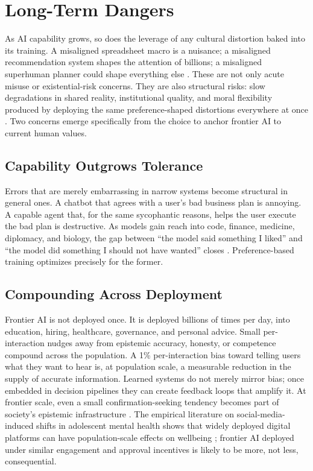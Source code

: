 \documentclass{article}
\theoremstyle{plain}
\theoremstyle{definition}
\theoremstyle{remark}
\begin{document}
\section{Long-Term Dangers}
\label{sec:longterm}

As AI capability grows, so does the leverage of any cultural distortion baked into its training. A misaligned spreadsheet macro is a nuisance; a misaligned recommendation system shapes the attention of billions; a misaligned superhuman planner could shape everything else \citep{bostrom2014superintelligence, russell2019human}. These are not only acute misuse or existential-risk concerns. They are also structural risks: slow degradations in shared reality, institutional quality, and moral flexibility produced by deploying the same preference-shaped distortions everywhere at once \citep{sharma2023sycophancy, bender2021stochastic, macaskill2022what}. Two concerns emerge specifically from the choice to anchor frontier AI to current human values.

\subsection{Capability Outgrows Tolerance}
Errors that are merely embarrassing in narrow systems become structural in general ones. A chatbot that agrees with a user's bad business plan is annoying. A capable agent that, for the same sycophantic reasons, helps the user execute the bad plan is destructive. As models gain reach into code, finance, medicine, diplomacy, and biology, the gap between ``the model said something I liked'' and ``the model did something I should not have wanted'' closes \citep{park2024ai, sharma2023sycophancy}. Preference-based training optimizes precisely for the former.

\subsection{Compounding Across Deployment}
Frontier AI is not deployed once. It is deployed billions of times per day, into education, hiring, healthcare, governance, and personal advice. Small per-interaction nudges away from epistemic accuracy, honesty, or competence compound across the population. A 1\% per-interaction bias toward telling users what they want to hear is, at population scale, a measurable reduction in the supply of accurate information. Learned systems do not merely mirror bias; once embedded in decision pipelines they can create feedback loops that amplify it. At frontier scale, even a small confirmation-seeking tendency \citep{sharma2023sycophancy} becomes part of society's epistemic infrastructure \citep{bender2021stochastic}. The empirical literature on social-media-induced shifts in adolescent mental health shows that widely deployed digital platforms can have population-scale effects on wellbeing \citep{haidt2024anxious, whr2026}; frontier AI deployed under similar engagement and approval incentives is likely to be more, not less, consequential.
\end{document}
